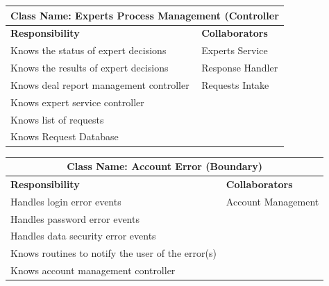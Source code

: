 \documentclass[]{article}
\begin{document}
\begin{itemize}
        \begin{table}[H]
        \centering
        \renewcommand{\arraystretch}{1.3} %
        \begin{tabular}{|p{6cm}|p{6cm}|} 
        \hline
        \multicolumn{2}{|c|}{\textbf{Class Name: Experts Process Management (Controller}} \\ 
        \hline
        \textbf{Responsibility} & \textbf{Collaborators} \\ 
        \hline
        Knows the status of expert decisions & Experts Service \\
        Knows the results of expert decisions & Response Handler \\ 
        Knows deal report management controller & Requests Intake \\
        Knows expert service controller & \\
        Knows list of requests& \\
        Knows Request Database & \\
        \hline
        \end{tabular}
        \label{tab:crc_card}
        \end{table}

        \begin{table}[H]
        \centering
        \renewcommand{\arraystretch}{1.3} %
        \begin{tabular}{|p{6cm}|p{6cm}|} 
        \hline
        \multicolumn{2}{|c|}{\textbf{Class Name: Account Error (Boundary)}} \\ 
        \hline
        \textbf{Responsibility} & \textbf{Collaborators} \\ 
        \hline
        Handles login error events & Account Management \\
        Handles password error events & \\
        Handles data security error events & \\
        Knows routines to notify the user of the error(s) & \\
        Knows account management controller & \\
        \hline
        \end{tabular}
        \label{tab:crc_card}
        \end{table}


\end{itemize}
\end{document}

